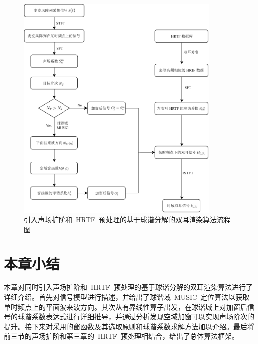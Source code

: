 \begin{figure}[H]
\centering
\includegraphics[width=0.88\textwidth]{figure/chapter4/algorithm}
\caption{引入声场扩阶和~HRTF~预处理的基于球谐分解的双耳渲染算法流程图}
\label{fig:algorithm}
\end{figure}

\section{本章小结}
本章对同时引入声场扩阶和~HRTF~预处理的基于球谐分解的双耳渲染算法进行了详细介绍。首先对信号模型进行描述，并给出了球谐域~MUSIC~定位算法以获取单时频点上的平面波来波方向。其次从有界线性算子出发，在球谐域上对加窗后信号的球谐系数表达式进行详细推导，并通过分析发现空域加窗可以实现声场阶次的提升。接下来对采用的窗函数及其选取原则和球谐系数求解方法加以介绍。最后将前三节的声场扩阶和第三章的~HRTF~预处理相结合，给出了总体算法框架。

